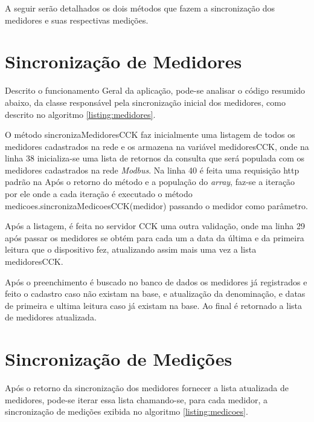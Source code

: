 A seguir serão detalhados os dois métodos que fazem a sincronização dos medidores e suas respectivas medições.

\section{Sincronização de Medidores}
\label{sec:sincronizacao-medidores}

Descrito o funcionamento Geral da aplicação, pode-se analisar o código resumido abaixo, da classe responsável pela sincronização inicial dos medidores, como descrito no algoritmo \ref{listing:medidores}.


O método sincronizaMedidoresCCK faz inicialmente uma listagem de todos os medidores cadastrados na rede e os armazena na variável medidoresCCK, onde na linha 38 inicializa-se uma lista de retornos da consulta que será populada com os medidores cadastrados na rede \textit{Modbus}. Na linha 40 é feita uma requisição http padrão na  Após o retorno do método e a população do \textit{array}, faz-se a iteração por ele onde a cada iteração é executado o método medicoes.sincronizaMedicoesCCK(medidor) passando o medidor como parâmetro. 

Após a listagem, é feita no servidor CCK uma outra validação, onde ma linha 29 após passar os medidores se obtém para cada um a data da última e da primeira leitura que o dispositivo fez, atualizando assim mais uma vez a lista medidoresCCK. 

Após o preenchimento é buscado no banco de dados os medidores já registrados e feito o cadastro caso não existam na base, e atualização da denominação, e datas de primeira e ultima leitura caso já existam na base. Ao final é retornado a lista de medidores atualizada.

\section{Sincronização de Medições}
\label{sec:sincronizacao-medicoes}

Após o retorno da sincronização dos medidores fornecer a lista atualizada de medidores, pode-se iterar essa lista chamando-se, para cada medidor, a sincronização de medições exibida no algoritmo \ref{listing:medicoes}.

